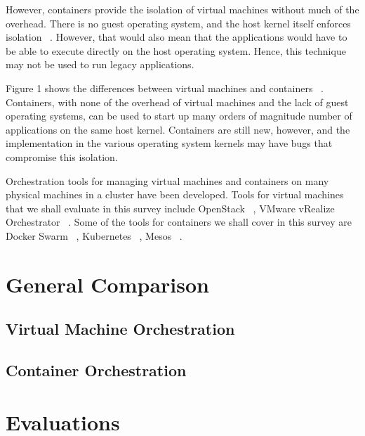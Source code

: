 \documentclass[10pt,twocolumn]{article}
\begin{document}
However, containers provide the isolation of virtual machines without much of the overhead. There is no guest operating system, and the host kernel itself enforces isolation ~\cite{intro_containerisation}.
However, that would also mean that the applications would have to be able to execute directly on the host operating system.
Hence, this technique may not be used to run legacy applications.

Figure 1 shows the differences between virtual machines and containers ~\cite{intro_containerisation}.
Containers, with none of the overhead of virtual machines and the lack of guest operating systems, can be used to start up many orders of magnitude number of applications on the same host kernel.
Containers are still new, however, and the implementation in the various operating system kernels may have bugs that compromise this isolation.

Orchestration tools for managing virtual machines and containers on many physical machines in a cluster have been developed.
Tools for virtual machines that we shall evaluate in this survey include OpenStack ~\cite{openstack}, VMware vRealize Orchestrator ~\cite{vrealize}.
Some of the tools for containers we shall cover in this survey are Docker Swarm ~\cite{docker_swarm}, Kubernetes ~\cite{kubernetes}, Mesos ~\cite{mesos}.

\section{General Comparison}



\subsection{Virtual Machine Orchestration}



\subsection{Container Orchestration}



\section{Evaluations}
\end{document}
